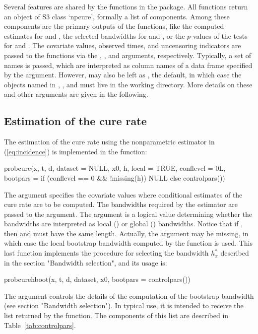 Several features are shared by the functions in the package. All functions return an object of S3 class `npcure', formally a list of components. Among these components are the primary outputs of the functions, like the computed estimates for  and , the selected bandwidths for  and , or the $p$-values of the tests for  and . The covariate values, observed times, and uncensoring indicators are passed to the functions via the , , and  arguments, respectively. Typically, a set of names is passed, which are interpreted as column names of a data frame specified by the  argument. However,  may also be left as , the default, in which case the objects named in , , and  must live in the working directory. More details on these and other arguments are given in the following.




\subsection{Estimation of the cure rate} \label{sec:cure rate estimation}

The estimation of the cure rate using the nonparametric estimator in (\ref{eq:incidence}) is implemented in the  function:
\begin{example}
probcure(x, t, d, dataset = NULL, x0, h, local = TRUE, conflevel = 0L,
   bootpars = if (conflevel == 0 && !missing(h)) NULL else controlpars())
\end{example}
The  argument specifies the covariate values where conditional estimates of the cure rate are to be computed. The bandwidths required by the estimator are passed to the  argument. The  argument is a logical value determining whether the bandwidths are interpreted as local () or global () bandwidths. Notice that if , then  and  must have the same length. Actually, the  argument may be missing, in which case the local bootstrap bandwidth computed by the  function is used. This last function implements the procedure for selecting the bandwidth $h_x^*$ described in the section "Bandwidth selection", and its usage is:

\begin{example}
probcurehboot(x, t, d, dataset, x0, bootpars = controlpars())
\end{example}
The  argument controls the details of the computation of the bootstrap bandwidth (see section "Bandwidth selection"). In typical use, it is intended to receive the list returned by the  function. The components of this list are described in Table~\ref{tab:controlpars}.

